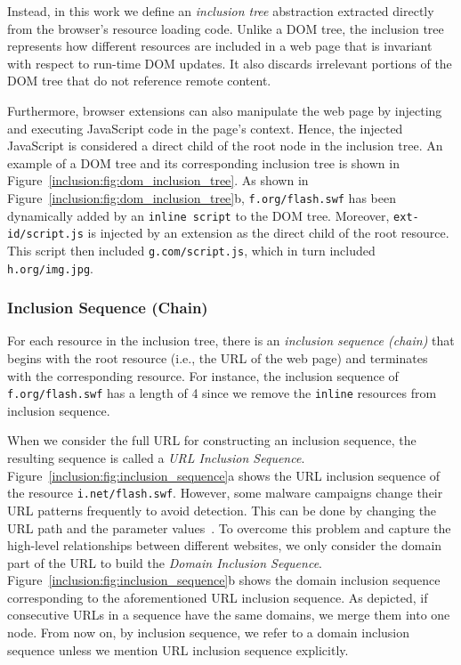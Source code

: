 Instead, in this work we define an \emph{inclusion tree} abstraction extracted
directly from the browser's resource loading code. Unlike a DOM tree, the
inclusion tree represents how different resources are included in a web page
that is invariant with respect to run-time DOM updates. It also discards
irrelevant portions of the DOM tree that do not reference remote content.

Furthermore, browser extensions can also manipulate the web page by injecting
and executing JavaScript code in the page's context. Hence, the injected
JavaScript is considered a direct child of the root node in the inclusion tree.
An example of a DOM tree and its corresponding inclusion tree is shown in
Figure~\ref{inclusion:fig:dom_inclusion_tree}. As shown in
Figure~\ref{inclusion:fig:dom_inclusion_tree}b, \texttt{f.org/flash.swf} has
been dynamically added by an \texttt{inline script} to the DOM tree. Moreover,
\texttt{ext-id/script.js} is injected by an extension as the direct child of the
root resource. This script then included \texttt{g.com/script.js}, which in turn
included \texttt{h.org/img.jpg}.

\subsubsection{Inclusion Sequence (Chain)}



For each resource in the inclusion tree, there is an \emph{inclusion sequence
(chain)} that begins with the root resource (i.e., the URL of the web page) and
terminates with the corresponding resource. For instance, the inclusion sequence
of \texttt{f.org/flash.swf} has a length of 4 since we remove the
\texttt{inline} resources from inclusion sequence.

When we consider the full URL for constructing an inclusion sequence, the
resulting sequence is called a \emph{URL Inclusion Sequence}.
Figure~\ref{inclusion:fig:inclusion_sequence}a shows the URL inclusion sequence
of the resource \texttt{i.net/flash.swf}. However, some malware campaigns change
their URL patterns frequently to avoid detection. This can be done by changing
the URL path and the parameter values~\cite{ccs2012madtracer}. To overcome this
problem and capture the high-level relationships between different websites, we
only consider the domain part of the URL to build the \emph{Domain Inclusion
Sequence}. Figure~\ref{inclusion:fig:inclusion_sequence}b shows the domain
inclusion sequence corresponding to the aforementioned URL inclusion sequence.
As depicted, if consecutive URLs in a sequence have the same domains, we merge
them into one node. From now on, by inclusion sequence, we refer to a domain
inclusion sequence unless we mention URL inclusion sequence explicitly.

